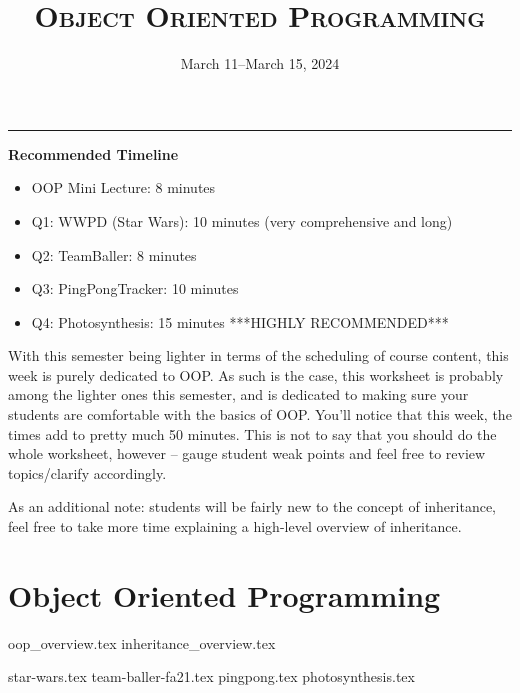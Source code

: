 \documentclass{exam}
\title{\textsc{Object Oriented Programming}}
\date{March 11--March 15, 2024}
\begin{document}
	\maketitle
	\rule{\textwidth}{0.15em}

\begin{meta}
	\textbf{Recommended Timeline}
	\begin{itemize}
		\item OOP Mini Lecture: 8 minutes
		\item Q1: WWPD (Star Wars): 10 minutes (very comprehensive and long)
		\item Q2: TeamBaller: 8 minutes
        \item Q3: PingPongTracker: 10 minutes
		\item Q4: Photosynthesis: 15 minutes ***HIGHLY RECOMMENDED*** 
	\end{itemize}
With this semester being lighter in terms of the scheduling of course content, this week is purely dedicated to OOP. As such is the case, this worksheet is probably among the lighter ones this semester, and is dedicated to making sure your students are comfortable with the basics of OOP. You'll notice that this week, the times add to pretty much 50 minutes. This is not to say that you should do the whole worksheet, however -- gauge student weak points and feel free to review topics/clarify accordingly.

As an additional note: students will be fairly new to the concept of inheritance, feel free to take more time explaining a high-level overview of inheritance. 
\end{meta}

\section{Object Oriented Programming}
{oop_overview.tex}
{inheritance_overview.tex}
\newpage
\begin{questions}
{star-wars.tex}
\newpage
{team-baller-fa21.tex}
\newpage
{pingpong.tex}
\newpage
{photosynthesis.tex}
\end{questions}
\end{document}
